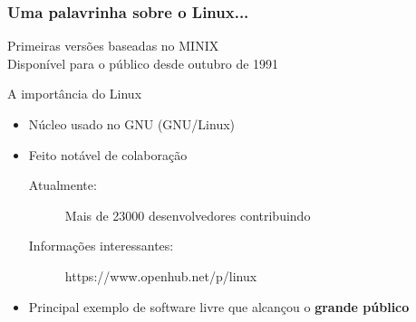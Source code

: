 \documentclass[xcolor=dvipsnames]{beamer}
\begin{document}
\begin{frame}
\frametitle{Uma palavrinha sobre o Linux...}
Primeiras versões baseadas no MINIX
\\[0.2cm]
Disponível para o público desde outubro de 1991\\[0.2cm]
  \begin{block}{A importância do Linux} 
  \begin{itemize}
  \item Núcleo usado no GNU (GNU/Linux) \vspace{0.1cm}
  \item Feito notável de colaboração 
  \begin{description}
  \item [Atualmente:] Mais de 23000 desenvolvedores contribuindo
  \item [Informações interessantes:] https://www.openhub.net/p/linux
  \end{description}
\vspace{0.1cm}  \item Principal exemplo de software livre que alcançou o {\bf grande público}
 
  \end{itemize}
  \end{block}
\end{frame}
\end{document}
